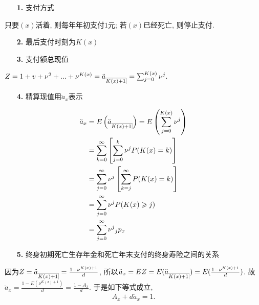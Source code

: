 \documentclass[a4paper,openany, 10pt]{ctexbook}
\makeatletter
\newcommand{\hei}{\CJKfamily{hei}}      %
\def\z{\left}
\def\y{\right}
\DeclareRobustCommand{\annu}[1]{_{%
    \def\arraystretch{0}%
    \setlength\arraycolsep{1pt}%
    \setlength\arrayrulewidth{.2pt}%
    \begin{array}[b]{@{}c|}\hline
        \\[\arraycolsep]%
        \scriptstyle #1%
    \end{array}%
}}
\makeatother
\begin{document}
\begin{itemize}
    \item[{\bf\hei 1.}]支付方式
\end{itemize}

只要$(x)$活着, 则每年年初支付$1$元; 若$(x)$已经死亡, 则停止支付.

\begin{itemize}
    \item[{\bf\hei 2.}]最后支付时刻为$K(x)$
\end{itemize}

\begin{itemize}
    \item[{\bf\hei 3.}]支付额总现值
\end{itemize}

$Z=1+v+\nu^2+...+\nu^{K(x)}=\ddot a_{\annu {K(x)+1}}=\sum_{j=0}^{K\left( x \right)}{\nu^j}.$

\begin{itemize}
    \item[{\bf\hei 4.}]精算现值用$\ddot a_x$表示
\end{itemize}
\begin{align*}
    \ddot a_x & =E\z(\ddot a_{\annu {K(x)+1}}\y)=E\z(\sum_{j=0}^{K\left( x \right)}{\nu^j}\y) \\
              & = \sum_{k=0}^{\infty}\z[\sum_{j=0}^{k}{\nu^j}P(K(x) = k)\y]               \\
              & = \sum_{j=0}^{\infty}\nu^j\z[\sum_{k=j}^{\infty}P(K(x) = k)\y]            \\
              & =\sum_{j=0}^{\infty}{\nu^j}P(K(x) \geqslant j)                        \\
              & =\sum_{j=0}^{\infty}{\nu^j}{}_jp_x                                   \\
\end{align*}




\begin{itemize}
    \item[{\bf\hei 5.}]终身初期死亡生存年金和死亡年末支付的终身寿险之间的关系
\end{itemize}

因为$Z=\ddot a_{\annu {K(x)+1}}=\frac{1-\nu^{K(x)+1}}{d}$, 所以$\ddot a_x=EZ=E(\ddot a_{\annu {K(x)+1}})=E(\frac{1-\nu^{K(x)+1}}{d})$. 故$\ddot a_{x}=\frac{1-E(\nu^{K(x)+1})}{d}=\frac{1-A_x}{d}$.
于是如下等式成立,
\begin{align*}
    A_x+d \ddot a_x=1.
\end{align*}
\end{document}
